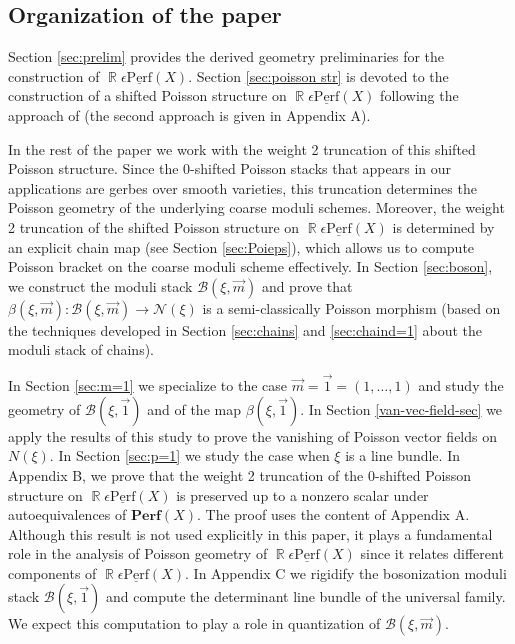\documentclass[reqno]{amsart}
\DeclareMathOperator\R{\mathbb R}
\theoremstyle{definition}
\theoremstyle{remark}
\newcommand{\ul}{\underline}
\newcommand{\eps}{\epsilon}
\newcommand{\cplx}{{\mathrm{Cplx}}}
\newcommand{\perf}{\mathbf{Perf}}
\newcommand{\uperf}{\ul{\mathrm{Perf}}}
\newcommand{\sB}{\mathscr{B}}
\newcommand{\sN}{\mathscr{N}}
\newcommand{\am}{\overrightarrow{m}}
\newcommand{\aone}{\overrightarrow{1}}
\numberwithin{equation}{section}
\begin{document}
\subsection{Organization of the paper}
Section \ref{sec:prelim} provides the derived geometry preliminaries for the construction of $\R\eps\uperf(X)$. Section \ref{sec:poisson str} is devoted to the construction of a shifted Poisson structure on $\R\eps\uperf(X)$ following the approach of \cite{HP1} (the second approach is given in Appendix A). 

In the rest of the paper we work with the weight 2 truncation of this shifted Poisson structure.
Since the 0-shifted Poisson stacks that appears in our applications are gerbes over smooth varieties, this truncation determines the Poisson geometry of the underlying coarse moduli schemes. Moreover, the weight 2 truncation of the shifted Poisson structure on $\R\eps\uperf(X)$ is determined by an explicit chain map (see Section \ref{sec:Poieps}), which allows us to compute Poisson bracket on the coarse moduli scheme effectively. In Section \ref{sec:boson}, we construct the moduli stack $\sB(\xi,\am) $ and prove that $\beta(\xi,\am): \sB(\xi,\am)\to \sN(\xi)$ is a semi-classically Poisson morphism (based on the techniques developed in Section \ref{sec:chains} and \ref{sec:chaind=1} about the moduli stack of chains). 

In Section \ref{sec:m=1} we specialize to the case $\am=\aone=(1,\ldots,1)$ and study the geometry of $\sB(\xi,\aone)$ and of the map $\beta(\xi,\aone)$. 
In Section \ref{van-vec-field-sec} we apply the results of this study to prove the vanishing of Poisson vector fields on $N(\xi)$. 
In Section \ref{sec:p=1} we study the case when $\xi$ is a line bundle. In Appendix B, we prove that the weight 2 truncation of the 0-shifted Poisson structure on $\R\eps\uperf(X)$ is preserved up to a nonzero scalar under autoequivalences of $\perf(X)$. The proof uses the content of Appendix A. Although this result is not used explicitly in this paper, it plays a fundamental role in the analysis of Poisson geometry of $\R\eps\uperf(X)$ since it relates different components of $\R\eps\uperf(X)$. In Appendix C we rigidify the bosonization moduli stack $\sB(\xi,\aone)$ 
and compute the determinant line bundle of the universal family. 
We expect this computation to play a role in quantization of $\sB(\xi,\am)$. 
\end{document}
